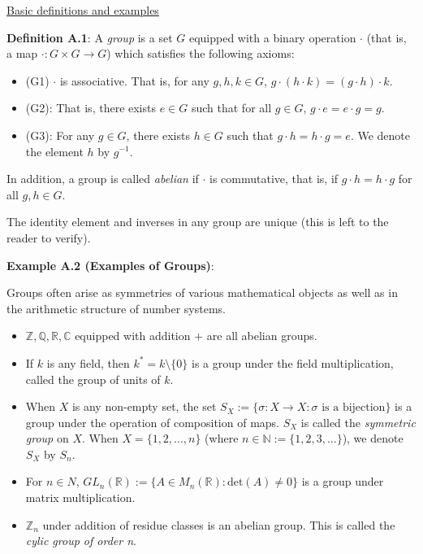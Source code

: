 \documentclass[12pt]{article}
\newcommand{\vs}{\vskip10pt}
\begin{document}
	\underline{Basic definitions and examples}
	
	\vs
	
	\textbf{Definition A.1}: A \textit{group} is a set $G$ equipped with a binary operation $\cdot$ (that is, a map $\cdot: G \times G \rightarrow G$) which satisfies the following axioms: 
	
	\begin{itemize}
		\item (G1) $\cdot$ is associative. That is, for any $g,h,k \in G$, $g\cdot(h \cdot k) = (g \cdot h) \cdot k$.
		\item (G2): That is, there exists $e \in G$ such that for all $g \in G$, $g\cdot e = e \cdot g = g$.
		\item (G3): For any $g \in G$, there exists $h \in G$ such that $g \cdot h = h \cdot g = e$. We denote the element $h$ by $g^{-1}$.
	\end{itemize}
	
	In addition, a group is called \textit{abelian} if $\cdot$ is commutative, that is, if $g \cdot h = h \cdot g$ for all $g,h \in G$. 
	
	\vs 
	
	The identity element and inverses in any group are unique (this is left to the reader to verify). 
	
	\vs
	
	\textbf{Example A.2 (Examples of Groups)}: 
	
	Groups often arise as symmetries of various mathematical objects as well as in the arithmetic structure of number systems.
	
	\begin{itemize}
		\item $\mathbb{Z}, \mathbb{Q}, \mathbb{R}, \mathbb{C}$ equipped with addition $+$ are all abelian groups. 
		\item If $k$ is any field, then $k^{*} = k \setminus \{0\}$ is a group under the field multiplication, called the group of units of $k$.
		\item When $X$ is any non-empty set, the set $S_X := \{\sigma: X \rightarrow X  : \sigma \text{ is a bijection}\}$ is a group under the operation of composition of maps. $S_X$ is called the \textit{symmetric group} on $X$. When $X = \{1,2,...,n\}$ (where $n \in \mathbb{N} := \{1,2,3,...\}$), we denote $S_X$ by $S_n$.
		\item For $n \in N$, $GL_n(\mathbb{R}) := \{A \in M_n(\mathbb{R})  : \text{det}(A) \neq 0\}$ is a group under matrix multiplication. 
		\item $\mathbb{Z}_n$ under addition of residue classes is an abelian group. This is called the \textit{cylic group of order n}. 
	\end{itemize}
	
\end{document}
